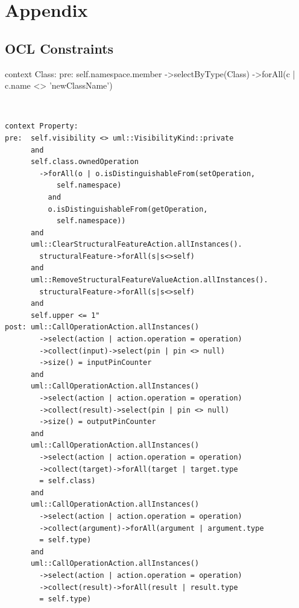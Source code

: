 \documentclass{llncs}
\begin{document}
\newpage



\newpage
\appendix
\section{Appendix}
\label{sec:appendix}

\subsection{OCL Constraints}
\label{sec:appconstraints}

\begin{lstsingle}[language=OCL,caption=OCL for \textit{rename class} refactoring,label=lst:renameclass]
context Class:
pre:  self.namespace.member
      ->selectByType(Class)
      ->forAll(c | c.name <> 'newClassName')
\end{lstsingle}
\\
\begin{lstlisting}[language=OCL,caption=OCL for \textit{encapsulate property} refactoring,label=lst:encapsulate]
context Property:
pre:  self.visibility <> uml::VisibilityKind::private 
      and 
      self.class.ownedOperation
        ->forAll(o | o.isDistinguishableFrom(setOperation, 
            self.namespace)
          and 
          o.isDistinguishableFrom(getOperation, 
            self.namespace)) 
      and 
      uml::ClearStructuralFeatureAction.allInstances().
        structuralFeature->forAll(s|s<>self)
      and
      uml::RemoveStructuralFeatureValueAction.allInstances().
        structuralFeature->forAll(s|s<>self)
      and
      self.upper <= 1"
post: uml::CallOperationAction.allInstances()
        ->select(action | action.operation = operation)
        ->collect(input)->select(pin | pin <> null)
        ->size() = inputPinCounter
      and
      uml::CallOperationAction.allInstances()
        ->select(action | action.operation = operation)
        ->collect(result)->select(pin | pin <> null)
        ->size() = outputPinCounter
      and
      uml::CallOperationAction.allInstances()
        ->select(action | action.operation = operation)
        ->collect(target)->forAll(target | target.type 
        = self.class)
      and 
      uml::CallOperationAction.allInstances()
        ->select(action | action.operation = operation)
        ->collect(argument)->forAll(argument | argument.type 
        = self.type)
      and
      uml::CallOperationAction.allInstances()
        ->select(action | action.operation = operation)
        ->collect(result)->forAll(result | result.type 
        = self.type)
\end{lstlisting}
\end{document}

